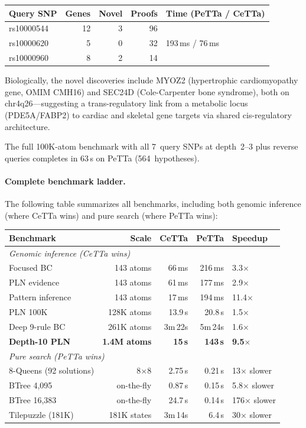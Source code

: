 \documentclass[11pt]{article}
\newcommand{\PeTTa}{\textup{PeTTa}}
\newcommand{\CeTTa}{\textup{CeTTa}}
\begin{document}
\begin{center}
\begin{tabular}{lrrrl}
\toprule
Query SNP & Genes & Novel & Proofs & Time (\PeTTa{} / \CeTTa{}) \\
\midrule
rs10000544 & 12 & 3 & 96  & \multirow{3}{*}{193\,ms / 76\,ms} \\
rs10000620 &  5 & 0 & 32  & \\
rs10000960 &  8 & 2 & 14  & \\
\bottomrule
\end{tabular}
\end{center}

Biologically, the novel discoveries include MYOZ2 (hypertrophic
cardiomyopathy gene, OMIM CMH16) and SEC24D (Cole-Carpenter bone
syndrome), both on chr4q26---suggesting a trans-regulatory link from a
metabolic locus (PDE5A/FABP2) to cardiac and skeletal gene targets via
shared cis-regulatory architecture.

The full 100K-atom benchmark with all 7~query SNPs at depth~2--3
plus reverse queries completes in 63\,s on \PeTTa{} (564~hypotheses).

\paragraph{Complete benchmark ladder.}
The following table summarizes all benchmarks, including both genomic
inference (where \CeTTa{} wins) and pure search (where \PeTTa{} wins):

\begin{center}
\begin{tabular}{lrrrl}
\toprule
Benchmark & Scale & \CeTTa{} & \PeTTa{} & Speedup \\
\midrule
\multicolumn{5}{l}{\emph{Genomic inference (\CeTTa{} wins)}} \\
Focused BC         &     143 atoms &   66\,ms &   216\,ms & 3.3$\times$ \\
PLN evidence       &     143 atoms &   61\,ms &   177\,ms & 2.9$\times$ \\
Pattern inference  &     143 atoms &   17\,ms &   194\,ms & 11.4$\times$ \\
PLN 100K           & 128K atoms    &  13.9\,s &   20.8\,s & 1.5$\times$ \\
Deep 9-rule BC     & 261K atoms    & 3m\,22s  &  5m\,24s  & 1.6$\times$ \\
\textbf{Depth-10 PLN}  & \textbf{1.4M atoms}
                        & \textbf{15\,s} & \textbf{143\,s} & \textbf{9.5$\times$} \\
\midrule
\multicolumn{5}{l}{\emph{Pure search (\PeTTa{} wins)}} \\
8-Queens (92 solutions) &  8$\times$8 &  2.75\,s &  0.21\,s & 13$\times$ slower \\
BTree 4{,}095           & on-the-fly  &  0.87\,s &  0.15\,s & 5.8$\times$ slower \\
BTree 16{,}383          & on-the-fly  &  24.7\,s &  0.14\,s & 176$\times$ slower \\
Tilepuzzle (181K)       & 181K states & 3m\,14s  &  6.4\,s  & 30$\times$ slower \\
\bottomrule
\end{tabular}
\end{center}
\end{document}
